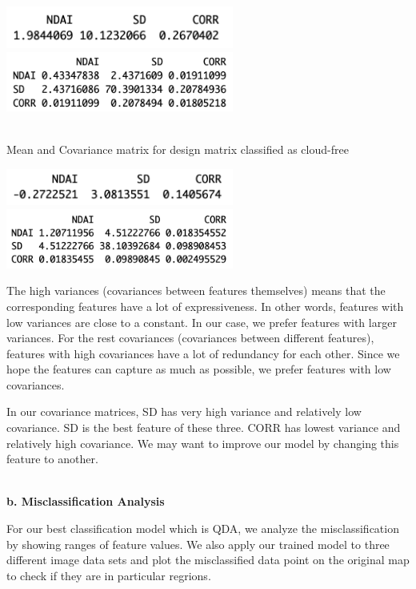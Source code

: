 \documentclass[11pt]{article}
\begin{document}
\includegraphics[width = 7.5cm]{4(a)1}
\includegraphics[width = 7.5cm]{4(a)2}

\mbox{}\\
Mean and Covariance matrix for design matrix classified as cloud-free

\includegraphics[width = 7.5cm]{4(a)3}
\includegraphics[width = 7.5cm]{4(a)4}

The high variances (covariances between features themselves) means that the corresponding features have a lot of expressiveness. In other words, features with low variances are close to a constant. In our case, we prefer features with larger variances. For the rest covariances (covariances between different features), features with high covariances have a lot of redundancy for each other. Since we hope the features can capture as much as possible, we prefer features with low covariances.

In our covariance matrices, SD has very high variance and relatively low covariance. SD is the best feature of these three. CORR has lowest variance and relatively high covariance. We may want to improve our model by changing this feature to another.

\vspace{0.3cm}
\mbox{}\\
\textbf{b. Misclassification Analysis}

For our best classification model which is QDA, we analyze the misclassification by showing ranges of feature values. We also apply our trained model to three different image data sets and plot the misclassified data point on the original map to check if they are in particular regrions.
\end{document}
